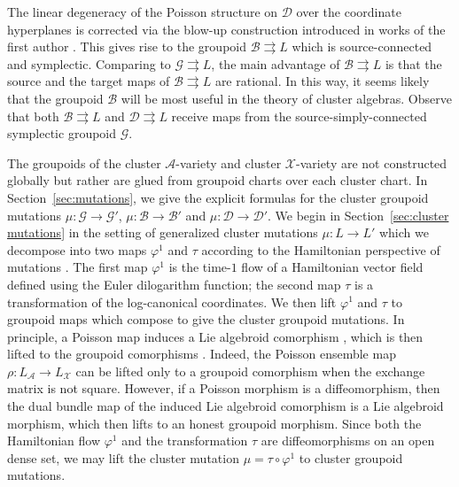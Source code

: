 \documentclass{amsart}
\numberwithin{equation}{section}
\newcommand{\cA}{\mathcal{A}}
\newcommand{\cB}{\mathcal{B}}
\newcommand{\cD}{\mathcal{D}}
\newcommand{\cG}{\mathcal{G}}
\newcommand{\cX}{\mathcal{X}}
\newcommand{\rra}{\rightrightarrows}
\begin{document}
The linear degeneracy of the Poisson structure on $\cD$ over the coordinate hyperplanes is corrected via the blow-up construction introduced in works of the first author \cite{Li13, GL14}.
This gives rise to the groupoid $\cB \rra L$ which is source-connected and symplectic.
Comparing to $\cG \rra L$, the main advantage of $\cB \rra L$ is that the source and the target maps of $\cB \rra L$ are rational.
In this way, it seems likely that the groupoid $\cB$ will be most useful in the theory of cluster algebras.
Observe that both $\cB \rra L$ and $\cD \rra L$ receive maps from the source-simply-connected symplectic groupoid $\cG$.

The groupoids of the cluster $\cA$-variety and cluster $\cX$-variety are not constructed globally but rather are glued from groupoid charts over each cluster chart.
In Section~\ref{sec:mutations}, we give the explicit formulas for the cluster groupoid mutations $\mu: \cG \to \cG'$, $\mu: \cB \to \cB'$ and $\mu: \cD \to \cD'$.
We begin in Section~\ref{sec:cluster mutations} in the setting of generalized cluster mutations $\mu: L \to L'$ which we decompose into two maps $\varphi^1$ and $\tau$ according to the Hamiltonian perspective of mutations \cite{FG09a, GNR17}.
The first map $\varphi^1$ is the time-$1$ flow of a Hamiltonian vector field defined using the Euler dilogarithm function; the second map $\tau$ is a transformation of the log-canonical coordinates.
We then lift $\varphi^1$ and $\tau$ to groupoid maps which compose to give the cluster groupoid mutations.
In principle, a Poisson map induces a Lie algebroid comorphism \cite{HM90}, which is then lifted to the groupoid comorphisms \cite{Cat04, CDW13}.
Indeed, the Poisson ensemble map $\rho: L_\cA \to L_\cX$ can be lifted only to a groupoid comorphism when the exchange matrix is not square.
However, if a Poisson morphism is a diffeomorphism, then the dual bundle map of the induced Lie algebroid comorphism is a Lie algebroid morphism, which then lifts to an honest groupoid morphism.
Since both the Hamiltonian flow $\varphi^1$ and the transformation $\tau$ are diffeomorphisms on an open dense set, we may lift the cluster mutation $\mu = \tau \circ \varphi^1$ to cluster groupoid mutations.
\bigskip
\end{document}
